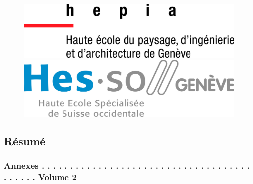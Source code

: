 \documentclass[a4paper, 12pt]{article}
\begin{document}
\begin{figure}[!b]
	\centering
	\begin{minipage}{.5\textwidth}
		\centering
		\includegraphics[width=.7\linewidth]{images/hepia.jpg}
	\end{minipage}%
	\begin{minipage}{.5\textwidth}
		\centering
		\includegraphics[width=.7\linewidth]{images/hesso.jpg}
	\end{minipage}
\end{figure}
\newpage
\thispagestyle{empty}
\mbox{}


\newpage

\subsection*{Résumé} %

\newpage

\tableofcontents
\subsubsection*{Annexes . . . . . . . . . . . . . . . . . . . . . . . . . . . . . . . . . . . . . . . . . . . Volume 2}
\newpage
{}
\listoffigures
\newpage
\renewcommand{\listtablename}{Table des tables}
\listoftables
\newpage
\renewcommand\listoflistingscaption{Table des listings de code source}
\listoflistings
\newpage
\end{document}
